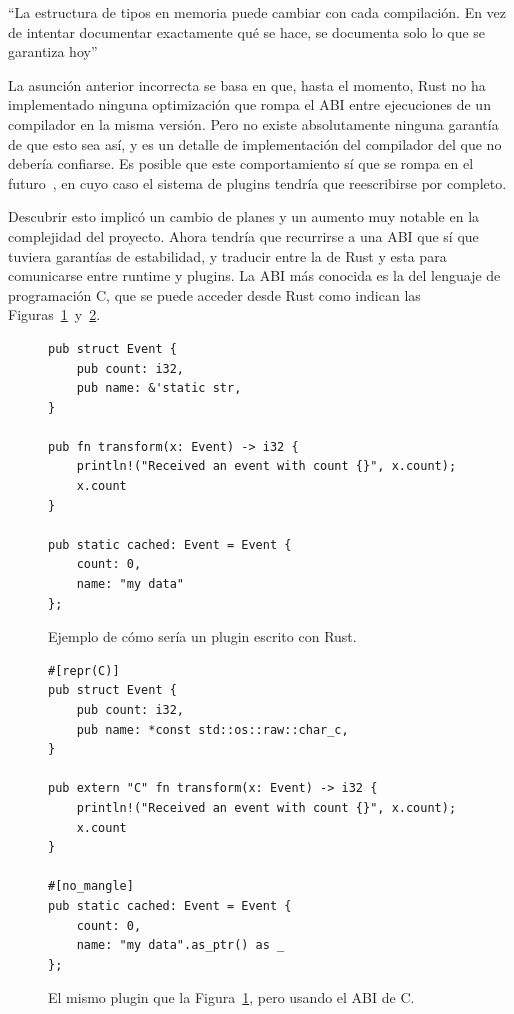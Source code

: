 ``La estructura de tipos en memoria puede cambiar con cada compilación. En vez
de intentar documentar exactamente qué se hace, se documenta solo lo que se
garantiza hoy''~\cite[Type Layout]{rustref}

La asunción anterior incorrecta se basa en que, hasta el momento, Rust no ha
implementado ninguna optimización que rompa el ABI entre ejecuciones de un
compilador en la misma versión. Pero no existe absolutamente ninguna garantía de
que esto sea así, y es un detalle de implementación del compilador del que no
debería confiarse. Es posible que este comportamiento sí que se rompa en el
futuro~\cite{randomizelayout}, en cuyo caso el sistema de plugins tendría que
reescribirse por completo.

Descubrir esto implicó un cambio de planes y un aumento muy notable en la
complejidad del proyecto. Ahora tendría que recurrirse a una ABI que sí que
tuviera garantías de estabilidad, y traducir entre la de Rust y esta para
comunicarse entre runtime y plugins. La ABI más conocida es la del lenguaje de
programación C, que se puede acceder desde Rust como indican las
Figuras~\ref{fig:rustpure}~y~\ref{fig:rustffi}.

\begin{figure}
    \centering
    \begin{verbatim}
pub struct Event {
    pub count: i32,
    pub name: &'static str,
}

pub fn transform(x: Event) -> i32 {
    println!("Received an event with count {}", x.count);
    x.count
}

pub static cached: Event = Event {
    count: 0,
    name: "my data"
};
    \end{verbatim}

    \caption{Ejemplo de cómo sería un plugin escrito con Rust.}%
    \label{fig:rustpure}
\end{figure}

\begin{figure}
    \centering
    \begin{verbatim}
#[repr(C)]
pub struct Event {
    pub count: i32,
    pub name: *const std::os::raw::char_c,
}

pub extern "C" fn transform(x: Event) -> i32 {
    println!("Received an event with count {}", x.count);
    x.count
}

#[no_mangle]
pub static cached: Event = Event {
    count: 0,
    name: "my data".as_ptr() as _
};
    \end{verbatim}

    \caption{El mismo plugin que la Figura~\ref{fig:rustpure}, pero usando el
    ABI de C.}%
    \label{fig:rustffi}
\end{figure}

